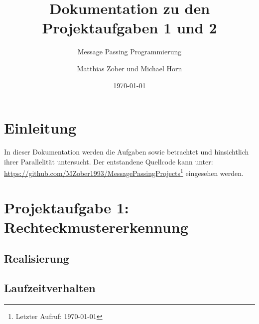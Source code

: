 	
					
\title{Dokumentation zu den Projektaufgaben 1 und 2}
\subtitle{Message Passing Programmierung}

\author{Matthias Zober und Michael Horn}
\date{\today}

\maketitle

\tableofcontents
\pagebreak

\section{Einleitung}
In dieser Dokumentation werden die Aufgaben  sowie  betrachtet und hinsichtlich ihrer Parallelität untersucht.
Der entstandene Quellcode kann unter:\\
\url{https://github.com/MZober1993/MessagePassingProjects}\footnote{Letzter Aufruf: \today}
eingesehen werden.
\section{Projektaufgabe 1: Rechteckmustererkennung}

\subsection{Realisierung}


\subsection{Laufzeitverhalten}

